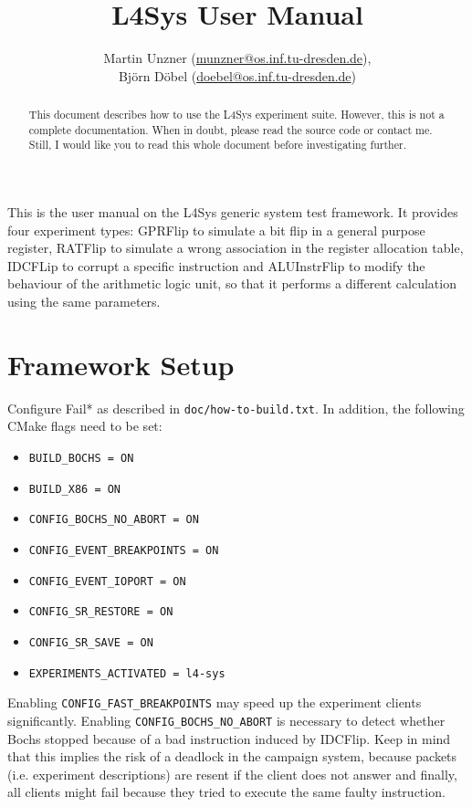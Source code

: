 \documentclass[a4paper,10pt]{article}
\title{L4Sys User Manual}
\author{Martin Unzner (\href{mailto:munzner@os.inf.tu-dresden.de}{munzner@os.inf.tu-dresden.de}), \\
        Björn Döbel (\href{mailto:doebel@os.inf.tu-dresden.de}{doebel@os.inf.tu-dresden.de})}
\begin{document}
\maketitle

\begin{abstract}
This document describes how to use the L4Sys experiment suite.
However, this is not a complete documentation. When in doubt,
please read the source code or contact me. Still, I would like
you to read this whole document before investigating further.
\end{abstract}

This is the user manual on the L4Sys generic system test framework.
It provides four experiment types: GPRFlip to simulate a bit flip
in a general purpose register, RATFlip to simulate a wrong association
in the register allocation table, IDCFLip to corrupt a specific instruction
and ALUInstrFlip to modify the behaviour of the arithmetic logic unit,
so that it performs a different calculation using the same parameters.

\section{Framework Setup}

Configure Fail* as described in \texttt{doc/how-to-build.txt}. In addition,
the following CMake flags need to be set:

\begin{itemize}
\item \verb+BUILD_BOCHS = ON+
\item \verb+BUILD_X86 = ON+
\item \verb+CONFIG_BOCHS_NO_ABORT = ON+
\item \verb+CONFIG_EVENT_BREAKPOINTS = ON+
\item \verb+CONFIG_EVENT_IOPORT = ON+
\item \verb+CONFIG_SR_RESTORE = ON+
\item \verb+CONFIG_SR_SAVE = ON+
\item \verb+EXPERIMENTS_ACTIVATED = l4-sys+
\end{itemize}

Enabling \verb+CONFIG_FAST_BREAKPOINTS+ may speed up the experiment clients
significantly. Enabling \verb+CONFIG_BOCHS_NO_ABORT+ is necessary to detect
whether Bochs stopped because of a bad instruction induced by IDCFlip.
Keep in mind that this implies the risk of a deadlock
in the campaign system, because packets (i.e. experiment descriptions)
are resent if the client does not answer and finally, all clients
might fail because they tried to execute the same faulty instruction.
\end{document}
